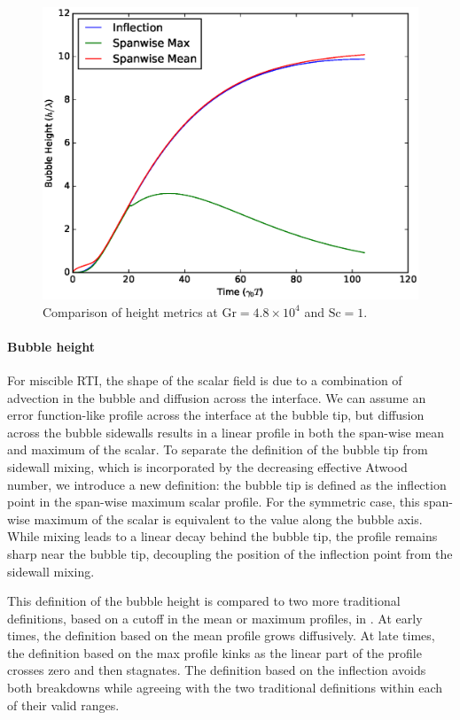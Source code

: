 \begin{figure}
\includegraphics[width=\textwidth]{figs/comp-height-8-8}
\caption{ 
  Comparison of height metrics at $\text{Gr} = 4.8\times10^4$ and $\text{Sc} = 1$.
}
\end{figure}


\paragraph{Bubble height}
For miscible RTI, the shape of the scalar field is due to a combination of advection in the bubble and diffusion across the interface.
We can assume an error function-like profile across the interface at the bubble tip, but diffusion across the bubble sidewalls results in a linear profile in both the span-wise mean and maximum of the scalar.
To separate the definition of the bubble tip from sidewall mixing, which is incorporated by the decreasing effective Atwood number, we introduce a new definition: the bubble tip is defined as the inflection point in the span-wise maximum scalar profile.
For the symmetric case, this span-wise maximum of the scalar is equivalent to the value along the bubble axis.
While mixing leads to a linear decay behind the bubble tip, the profile remains sharp near the bubble tip, decoupling the position of the inflection point from the sidewall mixing.

This definition of the bubble height is compared to two more traditional definitions, based on a cutoff in the mean or maximum profiles, in .
At early times, the definition based on the mean profile grows diffusively.
At late times, the definition based on the max profile kinks as the linear part of the profile crosses zero and then stagnates.
The definition based on the inflection avoids both breakdowns while agreeing with the two traditional definitions within each of their valid ranges.

